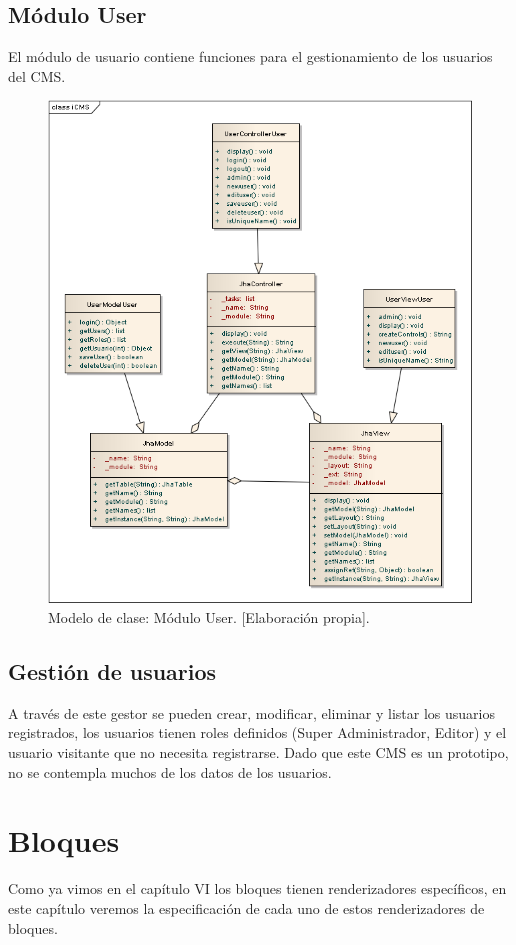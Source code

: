 \subsection{M\'odulo User}
El m\'odulo de usuario contiene funciones para el gestionamiento de los usuarios del CMS.

\begin{figure}[h]
\centering
\includegraphics[scale=.4, keepaspectratio=true]{imagenes/16_imagen.png}
\caption{Modelo de clase: M\'odulo User. [Elaboraci\'on propia].}
\end{figure}

\subsection{Gesti\'on de usuarios}
A trav\'es de este gestor se pueden crear, modificar, eliminar y listar los usuarios registrados, los usuarios tienen roles definidos (Super Administrador, Editor) y el usuario visitante que no necesita registrarse. Dado que este CMS es un prototipo, no se contempla muchos de los datos de los usuarios.

\section{Bloques}
Como ya vimos en el cap\'itulo VI los bloques tienen renderizadores espec\'ificos, en este cap\'itulo veremos la especificaci\'on de cada uno de estos renderizadores de bloques.

